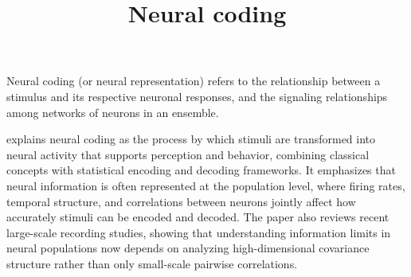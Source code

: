 \documentclass[a4paper]{article}
\title{Neural coding}
\date{}
\begin{document}
    \maketitle
    
    Neural coding (or neural representation) refers to the relationship between a stimulus and its respective neuronal responses, and the signaling relationships among networks of neurons in an ensemble. 
    
    \cite{shimazaki-2025-neural-coding-foundational-concepts-statistical-formulations-and-recent-advances} explains neural coding as the process by which stimuli are transformed into neural activity that supports perception and behavior, combining classical concepts with statistical encoding and decoding frameworks. It emphasizes that neural information is often represented at the population level, where firing rates, temporal structure, and correlations between neurons jointly affect how accurately stimuli can be encoded and decoded. The paper also reviews recent large-scale recording studies, showing that understanding information limits in neural populations now depends on analyzing high-dimensional covariance structure rather than only small-scale pairwise correlations.
    
    
    
    
    
    
    
\end{document}
